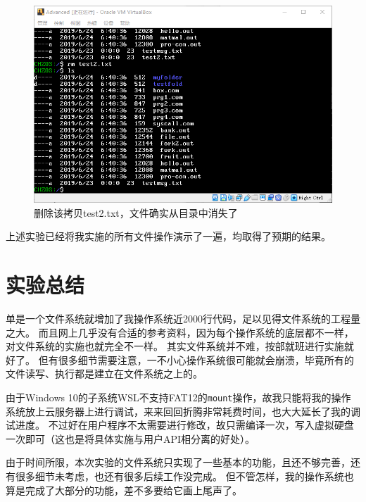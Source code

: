 \documentclass[logo,reportComp]{thesis}
\begin{document}
\begin{figure}[H]
\centering
\includegraphics[width=0.8\linewidth]{fig/cfile-rm.png}
\caption{删除该拷贝test2.txt，文件确实从目录中消失了}
\label{fig:cfile-rm}
\end{figure}

上述实验已经将我实施的所有文件操作演示了一遍，均取得了预期的结果。

\section{实验总结}
单是一个文件系统就增加了我操作系统近2000行代码，足以见得文件系统的工程量之大。
而且网上几乎没有合适的参考资料，因为每个操作系统的底层都不一样，对文件系统的实施也就完全不一样。
其实文件系统并不难，按部就班进行实施就好了。
但有很多细节需要注意，一不小心操作系统很可能就会崩溃，毕竟所有的文件读写、执行都是建立在文件系统之上的。

由于Windows 10的子系统WSL不支持FAT12的\verb'mount'操作，故我只能将我的操作系统放上云服务器上进行调试，来来回回折腾非常耗费时间，也大大延长了我的调试进度。
不过好在用户程序不太需要进行修改，故只需编译一次，写入虚拟硬盘一次即可（这也是将具体实施与用户API相分离的好处）。

由于时间所限，本次实验的文件系统只实现了一些基本的功能，且还不够完善，还有很多细节未考虑，也还有很多后续工作没完成。
但不管怎样，我的操作系统也算是完成了大部分的功能，差不多要给它画上尾声了。
\end{document}
